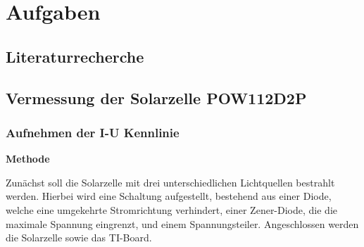 \documentclass{etit-workshop-protokoll}
\begin{document}
\section{Aufgaben}
\subsection {Literaturrecherche}                                    %
\subsection {Vermessung der Solarzelle POW112D2P}                   %
    \subsubsection{Aufnehmen der I-U Kennlinie}                         %
        \textbf{Methode}
        \newline
        
        \par Zunächst soll die Solarzelle mit drei unterschiedlichen Lichtquellen bestrahlt werden. Hierbei wird eine Schaltung aufgestellt, bestehend aus einer Diode, welche eine umgekehrte Stromrichtung verhindert, einer Zener-Diode, die die maximale Spannung eingrenzt, und einem Spannungsteiler. Angeschlossen werden die Solarzelle sowie das TI-Board.
        
\end{document}
